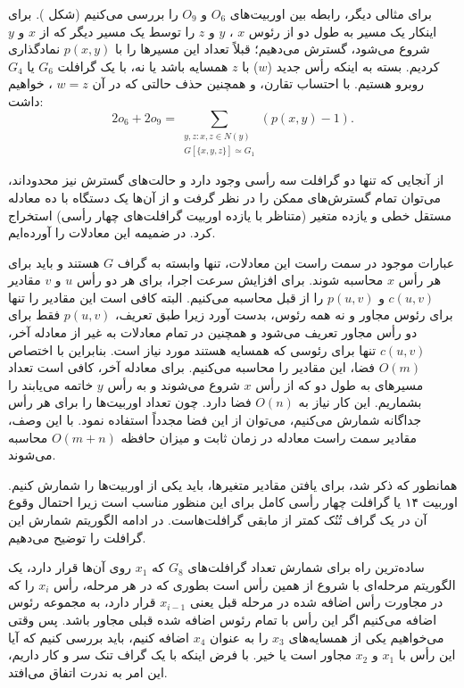 برای مثالی دیگر، رابطه بین اوربیت‌های $O_6$ و $O_9$ را بررسی می‌کنیم (شکل ). برای اینکار یک مسیر به طول دو از رئوس $x$ ، $y$ و $z$ را توسط یک مسیر دیگر که از $x$ و $y$ شروع می‌شود، گسترش می‌دهیم؛ قبلاً تعداد این مسیرها را با $p(x,y)$ نمادگذاری کردیم. بسته به اینکه رأس جدید ($w$) با $z$ همسایه باشد یا نه، با یک گرافلت $G_6$ یا $G_4$ روبرو هستیم. با احتساب تقارن، و همچنین حذف حالتی که در آن $w=z$ ، خواهیم داشت:
\begin{equation*}
2o_6+2o_9 = \sum_{\substack{y,z: x,z\in N(y)\\G[\{x,y,z\}] \simeq G_1 }}(p(x,y) - 1).
\end{equation*}

از آنجایی که تنها دو گرافلت سه رأسی وجود دارد و حالت‌های گسترش نیز محدود‌اند، می‌توان تمام گسترش‌های ممکن را در نظر گرفت و از آن‌ها یک دستگاه با ده معادله مستقل خطی و یازده متغیر (متناظر با یازده اوربیت گرافلت‌های چهار رأسی) استخراج کرد. در ضمیمه  این معادلات را آورده‌ایم.

عبارات موجود در سمت راست این معادلات، تنها وابسته به گراف $G$ هستند و باید برای هر رأس $x$ محاسبه شوند. برای افزایش سرعت اجرا، برای هر دو رأس $u$ و $v$ مقادیر $c(u,v)$ و $p(u,v)$ را از قبل محاسبه می‌کنیم. البته کافی است این مقادیر را تنها برای رئوس مجاور و نه همه رئوس، بدست آورد زیرا طبق تعریف، $p(u,v)$ فقط برای دو رأس مجاور تعریف می‌شود و همچنین در تمام معادلات به غیر از معادله آخر، $c(u,v)$ تنها برای رئوسی که همسایه هستند مورد نیاز است. بنابراین با اختصاص $O(m)$ فضا، این مقادیر را محاسبه می‌کنیم. برای معادله آخر، کافی است تعداد مسیر‌های به طول دو که از رأس $x$ شروع می‌شوند و به رأس $y$ خاتمه می‌یابند را بشماریم. این کار نیاز به $O(n)$ فضا دارد. چون تعداد اوربیت‌ها را برای هر رأس جداگانه شمارش می‌کنیم، می‌توان از این فضا مجدداً استفاده نمود. با این وصف، مقادیر سمت راست معادله در زمان ثابت و میزان حافظه $O(m+n)$ محاسبه می‌شوند.

همانطور که ذکر شد، برای یافتن مقادیر متغیرها، باید یکی از اوربیت‌ها را شمارش کنیم. اوربیت ۱۴ یا گرافلت چهار رأسی کامل برای این منظور مناسب است زیرا احتمال وقوع آن در یک گراف تُنُک کمتر از مابقی گرافلت‌هاست. در ادامه الگوریتم شمارش این گرافلت را توضیح می‌دهیم.

ساده‌ترین راه برای شمارش تعداد گرافلت‌های $G_8$ که $x_1$ روی آن‌ها قرار دارد، یک الگوریتم مرحله‌ای با شروع از همین رأس است بطوری که در هر مرحله، رأس $x_i$ را که در مجاورت رأس اضافه شده در مرحله قبل یعنی $x_{i-1}$ قرار دارد، به مجموعه رئوس اضافه می‌کنیم اگر این رأس با تمام رئوس اضافه شده قبلی مجاور باشد. پس وقتی می‌خواهیم یکی از همسایه‌های $x_3$ را به عنوان $x_4$ اضافه کنیم، باید بررسی کنیم که آیا این رأس با $x_1$ و $x_2$ مجاور است یا خیر. با فرض اینکه با یک گراف تنک سر و کار داریم، این امر به ندرت اتفاق می‌افتد.

